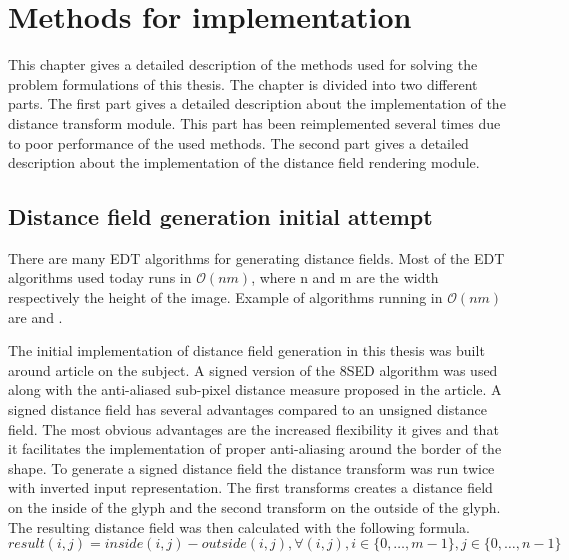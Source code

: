 \chapter{Methods for implementation}\label{cha:method_implementation}
This chapter gives a detailed description of the methods used for solving the problem formulations of this thesis. The chapter is divided into two different parts. The first part gives a detailed description about the implementation of the distance transform module. This part has been reimplemented several times due to poor performance of the used methods. The second part gives a detailed description about the implementation of the distance field rendering module.

\section{Distance field generation initial attempt}
There are many EDT algorithms for generating distance fields. Most of the EDT algorithms used today runs in $\mathcal{O}(nm)$, where n and m are the width respectively the height of the image. Example of algorithms running in $\mathcal{O}(nm)$ are \citet{Danielsson} and \citet{meijster}.

The initial implementation of distance field generation in this thesis was built around \citet{Gustavson:2011} article on the subject. A signed version of the 8SED algorithm was used along with the anti-aliased sub-pixel distance measure proposed in the article. A signed distance field has several advantages compared to an unsigned distance field. The most obvious advantages are the increased flexibility it gives and that it facilitates the implementation of proper anti-aliasing around the border of the shape\citep{gustavson20122d}. To generate a signed distance field the distance transform was run twice with inverted input representation. The first transforms creates a distance field on the inside of the glyph and the second transform on the outside of the glyph. The resulting distance field was then calculated with the following formula.\vspace{\baselineskip}\newline
$result(i,j) = inside(i,j) - outside(i,j), \forall (i, j), i \in \{0,\dots, m-1\}, j \in \{0,\dots, n-1\}$ \vspace{\baselineskip}\newline
